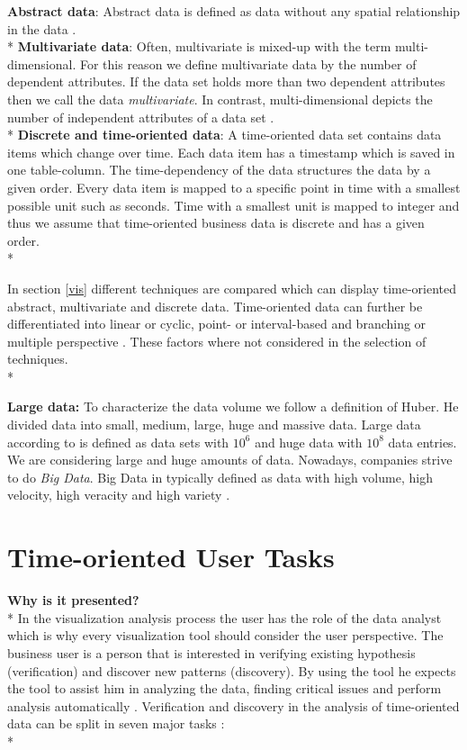 \textbf{Abstract data}: Abstract data is defined as data without any spatial relationship in the data  \cite{Shneiderman1996}. \\*
\textbf{Multivariate data}: 
Often, multivariate is mixed-up with the term multi-dimensional. For this reason we define  multivariate data by the number of dependent attributes. If the data set holds more than two dependent attributes then we call the data \textit{multivariate}. In contrast, multi-dimensional depicts the number of independent attributes of a data set \cite{Aigner2011}.  \\*
\textbf{Discrete and time-oriented data}: A time-oriented data set contains data items which change over time. Each data item has a timestamp which is saved in one table-column. The time-dependency of the data structures the data by a given order. Every data item is mapped to a specific point in time with a smallest possible unit such as seconds. Time with a smallest unit is mapped to integer  \cite{Aigner2011} and thus we assume that time-oriented business data is discrete and has a given order.  \\*

In section \ref{vis} different techniques are compared which can display time-oriented abstract, multivariate and discrete data. 
Time-oriented data can further be differentiated into linear or cyclic, point- or interval-based and branching or multiple perspective  \cite{Aigner2011}. These factors where not considered in the selection of techniques. \\*

\textbf{Large data:} To characterize the data volume we follow a definition of Huber. He divided data into small, medium, large, huge and massive data. Large data according to  \cite{Huber1994} is defined as data sets with $10^6$ and huge data with $10^8$ data entries. We are considering large and huge amounts of data. Nowadays, companies strive to do \textit{Big Data}. Big Data in typically defined as data with  high volume, high velocity, high veracity and high variety  \cite{Wang2015}. 



\section{Time-oriented User Tasks} \label{tasks}
\textbf{Why is it presented?}\\*
In the visualization analysis process the user has the role of the data analyst which is why every visualization tool should consider the user perspective. The business user is a person that is interested in verifying existing hypothesis (verification) and discover new patterns (discovery). By using the tool he expects the tool to assist him in analyzing the data, finding critical issues and perform analysis automatically  \cite{Brachman1996}. Verification and discovery in the analysis of time-oriented data can be split in seven major tasks  \cite{Esling2012}:\\*

